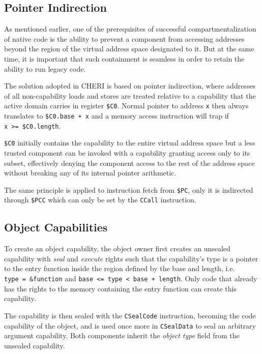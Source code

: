\documentclass[a4paper,12pt,twoside,openright]{report}
\newcommand{\reg}[1]{\texttt{\$#1}}
\newcommand{\insn}[1]{\texttt{#1}}
\begin{document}
\subsection{Pointer Indirection}

As mentioned earlier, one of the prerequisites of successful compartmentalization of native code is the ability to prevent a component from accessing addresses beyond the region of the virtual address space designated to it. But at the same time, it is important that such containment is seamless in order to retain the ability to run legacy code.

The solution adopted in CHERI is based on pointer indirection, where addresses of all non-capability loads and stores are treated relative to a capability that the active domain carries in register \reg{C0}. Normal pointer to address \texttt{x} then always translates to \texttt{\reg{C0}.base~+~x} and a memory access instruction will trap if \texttt{x~>=~\reg{C0}.length}. 

\reg{C0} initially contains the capability to the entire virtual address space but a less trusted component can be invoked with a capability granting access only to its subset, effectively denying the component access to the rest of the address space without breaking any of its internal pointer arithmetic.

The same principle is applied to instruction fetch from \reg{PC}, only it is indirected through \reg{PCC} which can only be set by the \insn{CCall} instruction.

\subsection{Object Capabilities}

To create an object capability, the object owner first creates an unsealed capability with \emph{seal} and \emph{execute} rights such that the capability's type is a pointer to the entry function inside the region defined by the base and length, i.e. \texttt{type~=~\&function} and \texttt{base~<=~type~<~base~+~length}. Only code that already has the rights to the memory containing the entry function can create this capability. 

The capability is then sealed with the \insn{CSealCode} instruction, becoming the code capability of the object, and is used once more in \insn{CSealData} to seal an arbitrary argument capability. Both components inherit the \emph{object type} field from the unsealed capability.
\end{document}
